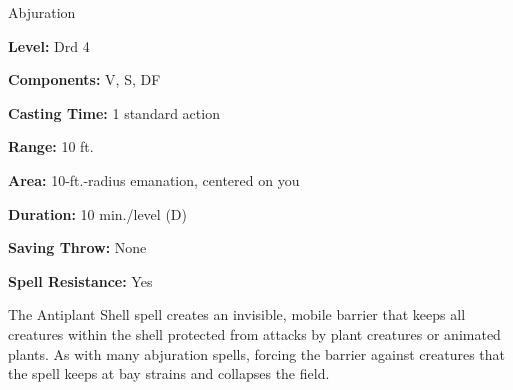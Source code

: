 
Abjuration

\textbf{Level:} Drd 4

\textbf{Components:} V, S, DF

\textbf{Casting Time:} 1 standard action

\textbf{Range:} 10 ft.

\textbf{Area:} 10-ft.-radius emanation, centered on you

\textbf{Duration:} 10 min./level (D)

\textbf{Saving Throw:} None

\textbf{Spell Resistance:} Yes

The Antiplant Shell spell creates an invisible, mobile barrier that keeps 
all creatures within the shell protected from attacks by plant creatures or animated 
plants. As with many abjuration spells, forcing the barrier against creatures that 
the spell keeps at bay strains and collapses the field.

